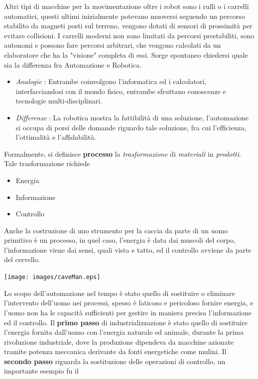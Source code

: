 \documentclass[10pt, letterpaper]{report}
\begin{document}
Altri tipi di macchine per la movimentazione oltre i robot sono i rulli o i carrelli automatici, questi ultimi 
inizialmente potevano muoversi seguendo un percorso stabilito da magneti posti sul terreno, vengono dotati di 
sensori di prossimità per evitare collisioni. I carrelli moderni non sono limitati da percorsi prestabiliti, sono 
autonomi e possono fare percorsi arbitrari, che vengono calcolati da un elaboratore che ha la "visione" completa 
di essi.\acc 
Sorge spontaneo chiedersi quale sia la differenza fra Automazione e Robotica.\begin{itemize}
    \item \textit{Analogie} : Entrambe coinvolgono l'informatica ed i calcolatori, interfacciandosi con il mondo 
    fisico, entrambe sfruttano conoscenze e tecnologie multi-disciplinari. 
    \item \textit{Differenze} : La robotica mostra la fattibilità di una soluzione, l'automazione si occupa di 
    porsi delle domande riguardo tale soluzione, fra cui l'efficienza, l'ottimalità e l'affidabilità.
\end{itemize}
Formalmente, si definisce \textbf{processo} la \textit{trasformazione} di \textit{materiali} in 
\textit{prodotti}. Tale trasformazione richiede 
\begin{itemize}
    \item Energia 
    \item Informazione 
    \item Controllo
\end{itemize}
Anche la costruzione di uno strumento per la caccia da parte di un uomo primitivo è un processo, in quel caso, 
l'energia è data dai muscoli del corpo, l'informazione viene dai sensi, quali vista e tatto, ed il controllo 
avviene da parte del cervello.
\begin{center}
    \texttt{[image: images/caveMan.eps]}
\end{center}
Lo scopo dell'automazione nel tempo è stato quello di sostituire o eliminare l'intervento dell'uomo 
nei processi, spesso è faticoso e pericoloso fornire energia, e l'uomo non ha le capacità sufficienti per 
gestire in maniera precisa l'informazione ed il controllo.\acc 
Il \textbf{primo passo} di industrializzazione è stato quello di sostituire l'energia fornita dall'uomo con l'energia 
naturale ed animale, durante la prima rivoluzione industriale, dove la produzione dipendeva da macchine 
azionate tramite potenza meccanica derivante da fonti energetiche come mulini.\acc 
Il \textbf{secondo passo} riguarda la sostituzione delle operazioni di controllo, un importante esempio fu il 
\end{document}
